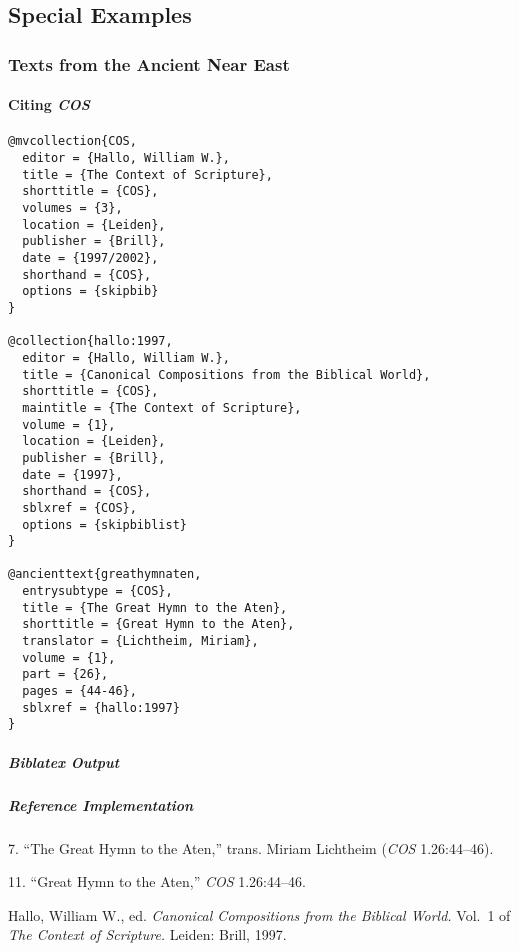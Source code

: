\documentclass[a4paper]{article}
\newenvironment{biboutput}{%
  \subparagraph{Biblatex Output}
}{\color{black}}
\newenvironment{refimp}{%
  \subparagraph{Reference Implementation}
  \color{reference-colour}
  \rm
}{\par\color{black}}
\begin{document}
\break

\subsection{Special Examples}

\subsubsection{Texts from the Ancient Near East}

\paragraph{Citing \emph{COS}}

\begin{lstlisting}
@mvcollection{COS,
  editor = {Hallo, William W.},
  title = {The Context of Scripture},
  shorttitle = {COS},
  volumes = {3},
  location = {Leiden},
  publisher = {Brill},
  date = {1997/2002},
  shorthand = {COS},
  options = {skipbib}
}

@collection{hallo:1997,
  editor = {Hallo, William W.},
  title = {Canonical Compositions from the Biblical World},
  shorttitle = {COS},
  maintitle = {The Context of Scripture},
  volume = {1},
  location = {Leiden},
  publisher = {Brill},
  date = {1997},
  shorthand = {COS},
  sblxref = {COS},
  options = {skipbiblist}
}

@ancienttext{greathymnaten,
  entrysubtype = {COS},
  title = {The Great Hymn to the Aten},
  shorttitle = {Great Hymn to the Aten},
  translator = {Lichtheim, Miriam},
  volume = {1},
  part = {26},
  pages = {44-46},
  sblxref = {hallo:1997}
}
\end{lstlisting}

\begin{biboutput}
\end{biboutput}

\begin{refimp}
  7. “The Great Hymn to the Aten,” trans. Miriam Lichtheim (\emph{COS}
  1.26:44–46).

  11. “Great Hymn to the Aten,” \emph{COS} 1.26:44–46.

  \hangindent\bibindent Hallo, William W., ed. \emph{Canonical Compositions
  from the Biblical World.} Vol.~1 of \emph{The Context of Scripture.} Leiden:
  Brill, 1997.

\end{refimp}
\end{document}
